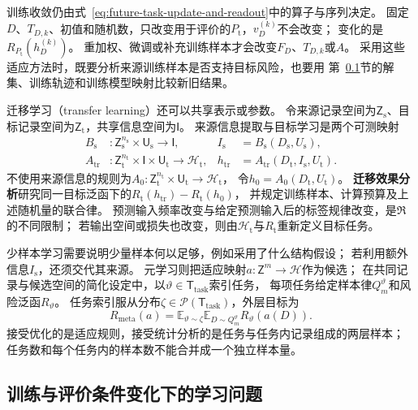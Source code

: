 训练收敛仍由式~\eqref{eq:future-task-update-and-readout}中的算子与序列决定。
固定$D$、$T_{D,k}$、初值和随机数，只改变用于评价的$P_{\mathrm t}$，$v_D^{(k)}$不会改变；
变化的是$R_{P_{\mathrm t}}(h_D^{(k)})$。
重加权、微调或补充训练样本才会改变$F_D$、$T_{D,k}$或$A$。
采用这些适应方法时，既要分析来源训练样本是否支持目标风险，也要用
第~\ref{sec:future-ml-changing-conditions}节的解集、训练轨迹和训练模型映射比较新旧结果。

迁移学习（transfer learning）还可以共享表示或参数。
令来源记录空间为$\mathsf Z_{\mathrm s}$、目标记录空间为$\mathsf Z_{\mathrm t}$，共享信息空间为$\mathsf I$。
来源信息提取与目标学习是两个可测映射
\[
  \begin{aligned}
    B_{\mathrm s}&:\mathsf Z_{\mathrm s}^{n_{\mathrm s}}\times\mathsf U_{\mathrm s}\to\mathsf I,
      &I_{\mathrm s}&=B_{\mathrm s}(D_{\mathrm s},U_{\mathrm s}),\\
    A_{\mathrm{tr}}&:\mathsf Z_{\mathrm t}^{n_{\mathrm t}}\times\mathsf I\times\mathsf U_{\mathrm t}\to\mathcal H_{\mathrm t},
      &h_{\mathrm{tr}}&=A_{\mathrm{tr}}(D_{\mathrm t},I_{\mathrm s},U_{\mathrm t}).
  \end{aligned}
\]
不使用来源信息的规则为$A_0:\mathsf Z_{\mathrm t}^{n_{\mathrm t}}\times\mathsf U_{\mathrm t}\to\mathcal H_{\mathrm t}$，
令$h_0=A_0(D_{\mathrm t},U_{\mathrm t})$。
\textbf{迁移效果分析}研究同一目标泛函下的$R_{\mathrm t}(h_{\mathrm{tr}})-R_{\mathrm t}(h_0)$，
并规定训练样本、计算预算及上述随机量的联合律。
预测输入频率改变与给定预测输入后的标签规律改变，是$\mathfrak R$的不同限制；
若输出空间或损失也改变，则由$\mathcal H_{\mathrm t}$与$R_{\mathrm t}$重新定义目标任务。

少样本学习需要说明少量样本何以足够，例如采用了什么结构假设；
若利用额外信息$I_{\mathrm s}$，还须交代其来源。
元学习则把适应映射$a:\mathsf Z^m\to\mathcal H$作为候选；
在共同记录与候选空间的简化设定中，以$\vartheta\in\mathsf T_{\mathrm{task}}$索引任务，
每项任务给定样本律$Q_m^{\vartheta}$和风险泛函$R_{\vartheta}$。
任务索引服从分布$\zeta\in\mathcal P(\mathsf T_{\mathrm{task}})$，外层目标为
\[
  R_{\mathrm{meta}}(a)=
  \mathbb E_{\vartheta\sim\zeta}
  \mathbb E_{D\sim Q_m^{\vartheta}}R_{\vartheta}(a(D)).
\]
接受优化的是适应规则，接受统计分析的是任务与任务内记录组成的两层样本；
任务数和每个任务内的样本数不能合并成一个独立样本量。

\subsection{训练与评价条件变化下的学习问题}
\label{sec:future-ml-changing-conditions}

